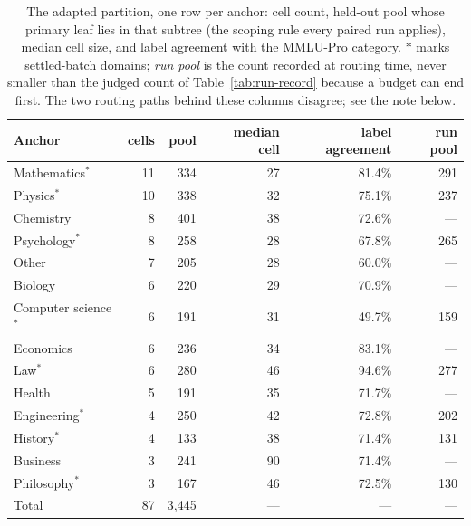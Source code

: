 \begin{table}[htbp]
\centering
\small
\caption{The adapted partition, one row per anchor: cell count,
held-out pool whose primary leaf lies in that subtree (the scoping
rule every paired run applies), median cell size, and label agreement
with the MMLU-Pro category. $\ast$ marks settled-batch domains;
\emph{run pool} is the count recorded at routing time, never smaller
than the judged count of Table~\ref{tab:run-record} because a budget
can end first. The two routing paths behind these columns disagree; see
the note below.}
\label{tab:anchor-cells}
\begin{tabular}{lrrrrr}
\toprule
Anchor & cells & pool & median cell & label agreement & run pool \\
\midrule
Mathematics$^\ast$      & 11 & 334 & 27 & 81.4\% & 291 \\
Physics$^\ast$          & 10 & 338 & 32 & 75.1\% & 237 \\
Chemistry               &  8 & 401 & 38 & 72.6\% & --- \\
Psychology$^\ast$       &  8 & 258 & 28 & 67.8\% & 265 \\
Other                   &  7 & 205 & 28 & 60.0\% & --- \\
Biology                 &  6 & 220 & 29 & 70.9\% & --- \\
Computer science$^\ast$ &  6 & 191 & 31 & 49.7\% & 159 \\
Economics               &  6 & 236 & 34 & 83.1\% & --- \\
Law$^\ast$              &  6 & 280 & 46 & 94.6\% & 277 \\
Health                  &  5 & 191 & 35 & 71.7\% & --- \\
Engineering$^\ast$      &  4 & 250 & 42 & 72.8\% & 202 \\
History$^\ast$          &  4 & 133 & 38 & 71.4\% & 131 \\
Business                &  3 & 241 & 90 & 71.4\% & --- \\
Philosophy$^\ast$       &  3 & 167 & 46 & 72.5\% & 130 \\
\midrule
Total                   & 87 & 3{,}445 & --- & --- & --- \\
\bottomrule
\end{tabular}
\end{table}

